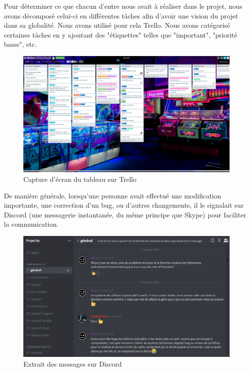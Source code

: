 \documentclass[a4paper, 11pt]{article}
\begin{document}
            Pour déterminer ce que chacun d'entre nous avait à réaliser dans le projet, nous avons décomposé celui-ci en différentes tâches afin d'avoir une vision du projet dans sa globalité. Nous avons utilisé pour cela Trello. Nous avons catégorisé certaines tâches en y ajoutant des "étiquettes" telles que "important", "priorité basse", etc.
            \newpage
            \begin{figure}[ht]
                \centering
                \includegraphics[scale=0.2]{images/trello.png}
                \caption{Capture d'écran du tableau sur Trello}
            \end{figure}
            
            De manière générale, lorsqu'une personne avait effectué une modification importante, une correction d'un bug, ou d'autres changements, il le signalait sur Discord (une messagerie instantanée, du même principe que Skype) pour faciliter la communication.
            
            \begin{figure}[ht]
                \centering
                \includegraphics[scale=0.5]{images/discord.png}
                \caption{Extrait des messages sur Discord}
            \end{figure}
            
\end{document}
